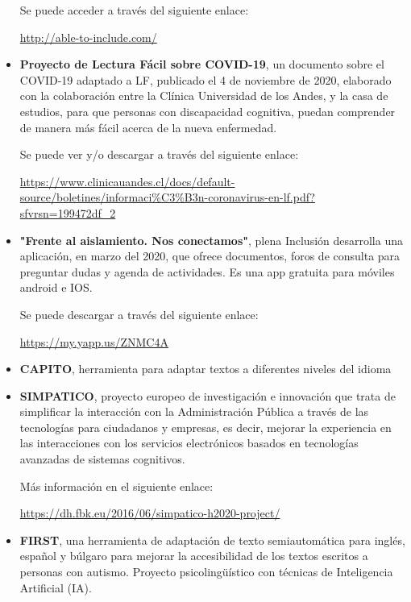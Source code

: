 \begin{itemize}
Se puede acceder a través del siguiente enlace:

\href{http://able-to-include.com/}{http://able-to-include.com/}

\item
{\textbf{Proyecto de Lectura Fácil sobre COVID-19}}, un documento sobre el COVID-19 adaptado a LF, publicado el 4 de noviembre de 2020, elaborado con la colaboración entre la Clínica Universidad de los Andes, y la casa de estudios, para que personas con discapacidad cognitiva, puedan comprender de manera más fácil acerca de la nueva enfermedad.

Se puede ver y/o descargar a través del siguiente enlace:

\href{https://www.clinicauandes.cl/docs/default-source/boletines/informaci\%C3\%B3n-coronavirus-en-lf.pdf?sfvrsn=199472df\_2}{https://www.clinicauandes.cl/docs/default-source/boletines/informaci\%C3\%B3n-coronavirus-en-lf.pdf?sfvrsn=199472df\_2}

\item
{\textbf{"Frente al aislamiento. Nos conectamos"}}, plena Inclusión desarrolla una aplicación, en marzo del 2020, que ofrece documentos, foros de consulta para preguntar dudas y agenda de actividades. Es una app gratuita para móviles android e IOS. 

Se puede descargar a través del siguiente enlace:

\href{https://my.yapp.us/ZNMC4A}{https://my.yapp.us/ZNMC4A}

\item
{\textbf{CAPITO}}, herramienta para adaptar textos a diferentes niveles del idioma

\item
{\textbf{SIMPATICO}}, proyecto europeo de investigación e innovación que trata de simplificar la interacción con la Administración Pública a través de las tecnologías para ciudadanos y empresas, es decir, mejorar la experiencia en las interacciones con los servicios electrónicos basados en tecnologías avanzadas de sistemas cognitivos. 

Más información en el siguiente enlace:


\href{https://dh.fbk.eu/2016/06/simpatico-h2020-project/}{https://dh.fbk.eu/2016/06/simpatico-h2020-project/}

\item
{\textbf{FIRST}}, una herramienta de adaptación de texto semiautomática para inglés, español y búlgaro para mejorar la accesibilidad de los textos escritos a personas con autismo. Proyecto psicolingüístico con técnicas de Inteligencia Artificial (IA).


\end{itemize}
